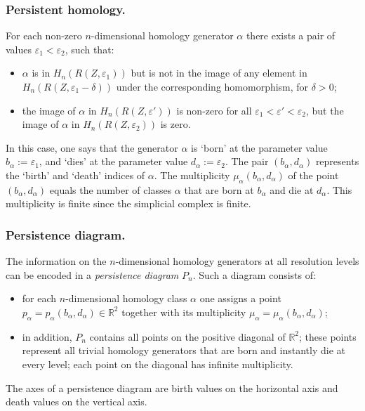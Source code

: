 \documentclass[11pt]{amsart}
\theoremstyle{definition}
\theoremstyle{remark}
\numberwithin{equation}{section}
\newcommand{\eps}{\varepsilon}
\begin{document}
\subsubsection{Persistent homology.} For each non-zero $n$-dimensional homology generator $\alpha$  there exists a pair of  values $\eps_1<\eps_2$, such that:
\begin{itemize}
\item   $\alpha$ is in $H_n(R(Z,\eps_1))$ but is not in the image of any element in $H_n(R(Z,\eps_1-\delta))$ under the corresponding homomorphism, for
$\delta>0$;
\item the  image of $\alpha$ in $H_n(R(Z,\eps'))$ is non-zero for all $\eps_1< \eps'<\eps_2$, but the  image of $\alpha$ in $H_n(R(Z,\eps_2))$ is zero.
\end{itemize}
In this case, one says that  the generator $\alpha$ is `born' at the parameter value $b_\alpha:=\eps_1$, and `dies' at the parameter value $d_\alpha:=\eps_2$. The
pair $(b_\alpha, d_\alpha)$ represents the `birth' and `death' indices of $\alpha$. The multiplicity
$\mu_\alpha(b_\alpha,d_\alpha)$ of the point $(b_\alpha,d_\alpha)$ equals the number of classes $\alpha$ that are born at ${b_\alpha}$ and die at ${d_\alpha}$.
This multiplicity is finite since the simplicial complex is finite.


\subsubsection{Persistence diagram.} The information on  the $n$-dimensional homology generators at all resolution levels can be encoded in a \emph{persistence diagram}
$P_n$. Such a diagram consists of:
\begin{itemize}
\item  for each $n$-dimensional homology class $\alpha$ one assigns a point $p_\alpha=p_\alpha(b_\alpha,d_\alpha)\in\mathbb{R}^2$ together with its
    multiplicity $\mu_\alpha=\mu_\alpha(b_\alpha,d_\alpha)$;
\item in addition, $P_n$ contains all points on the positive diagonal  of $\mathbb{R}^2$; these points represent  all trivial homology generators that are
    born and instantly die at every level; each point on the diagonal has infinite multiplicity.
\end{itemize}
The axes of a persistence diagram are birth values on the horizontal axis and death values on the vertical axis.
\end{document}
